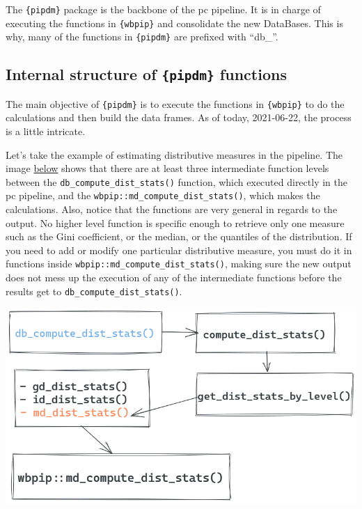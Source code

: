 \documentclass[
]{book}
\begin{document}
The \texttt{\{pipdm\}} package is the backbone of the pc pipeline. It is in charge of
executing the functions in \texttt{\{wbpip\}} and consolidate the new DataBases. This is
why, many of the functions in \texttt{\{pipdm\}} are prefixed with ``db\_''.

\hypertarget{internal-structure-of-pipdm-functions}{%
\subsection{\texorpdfstring{Internal structure of \texttt{\{pipdm\}} functions}{Internal structure of \{pipdm\} functions}}\label{internal-structure-of-pipdm-functions}}

The main objective of \texttt{\{pipdm\}} is to execute the functions in \texttt{\{wbpip\}} to do
the calculations and then build the data frames. As of today, 2021-06-22,
the process is a little intricate.

Let's take the example of estimating distributive measures in the pipeline. The
image \protect\hyperlink{pipdm-structure}{below} shows that there are at least three intermediate
function levels between the \texttt{db\_compute\_dist\_stats()} function, which executed
directly in the pc pipeline, and the \texttt{wbpip::md\_compute\_dist\_stats()}, which
makes the calculations. Also, notice that the functions are very general in
regards to the output. No higher level function is specific enough to retrieve
only one measure such as the Gini coefficient, or the median, or the quantiles
of the distribution. If you need to add or modify one particular distributive
measure, you must do it in functions inside \texttt{wbpip::md\_compute\_dist\_stats()},
making sure the new output does not mess up the execution of any of the
intermediate functions before the results get to \texttt{db\_compute\_dist\_stats()}.

\includegraphics{img/pipdm_structure.png}
\end{document}
